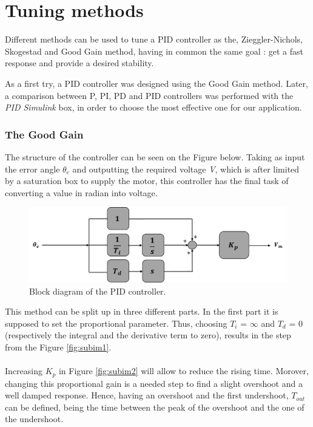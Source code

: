 \section{Tuning methods}
Different methods can be used to tune a PID controller as the, Zieggler-Nichols, Skogestad and Good Gain method, having in common the same goal : get a fast response and provide a desired stability.\par
As a first try, a PID controller was designed using the Good Gain method. Later, a comparison between P, PI, PD and PID controllers was performed with the \emph{PID Simulink} box, in order to choose the most effective one for our application.\par 	

\subsubsection{The Good Gain}


The structure of the controller can be seen on the Figure below. Taking as input the error angle \textbf{$\theta_{e}$} and outputting the required voltage \textit{V}, which is after limited by a saturation box to supply the motor, this controller has the final task of converting a value in radian into voltage.\par

\begin{figure}[H]
  \centering
  \includegraphics[scale=0.5]{figures/controller_model.png}
  \caption[LABEL] {Block diagram of the PID controller.}
\end{figure}
  
This method can be split up in three different parts. In the first part it is supposed to set the proportional parameter. Thus, choosing $T_i$ = $\infty$ and $T_d$ = 0 (respectively the integral and the derivative term to zero), results in the step from the Figure \ref{fig:subim1}.

\paragraph{}Increasing $K_p$ in Figure \ref{fig:subim2} will allow to reduce the rising time. Morover, changing this proportional gain is a needed step to find a slight overshoot and a well damped response. Hence, having an overshoot and the first undershoot, $T_{out}$ can be defined, being the time between the peak of the overshoot and the one of the undershoot.
